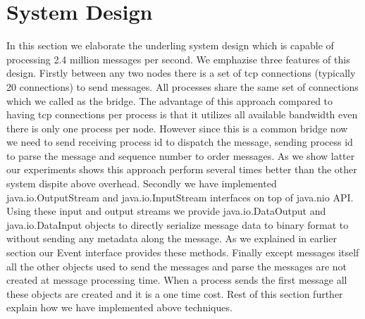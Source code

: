 \section{System Design}
In this section we elaborate the underling system design which is capable of processing 2.4 million messages per second. We emphazise three features of this design. Firstly between any two nodes there is a set of tcp connections (typically 20 connections)  to send messages. All processes share the same set of connections which we called as the bridge. The advantage of this approach compared to having tcp connections per process is that it utilizes all available bandwidth even there is only one process per node. However since this is a common bridge now we need to send receiving process id to dispatch the message, sending  process id to parse the message and sequence number to order messages. As we show latter our experiments shows this approach perform several times better than the other system dispite above overhead. Secondly we have implemented java.io.OutputStream and java.io.InputStream interfaces on top of java.nio API. Using these input and output streams we provide java.io.DataOutput and java.io.DataInput 
objects to directly serialize message data to binary format to without sending any metadata along the message. As we explained in earlier section our Event interface provides these methods. Finally except messages itself all the other objects used to send the messages and parse the messages are not created at message processing time. When a process sends the first message all these objects are created and it is a one time cost. Rest of this section further explain how we have implemented above techniques.
